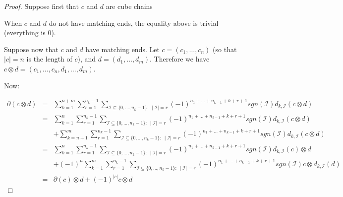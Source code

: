 \documentclass[10pt,a4paper]{amsart}
\begin{document}
\begin{proof}
Suppose first that $c$ and $d$ are cube chains

When $c$ and $d$ do not have matching ends, the equality above is trivial (everything is 0).

Suppose now that $c$ and $d$ have matching ends. 
Let $c=(c_1,\ldots,c_n)$ (so that $|c|=n$ is the length of $c$), and $d=(d_1,\ldots,d_m)$. Therefore we have $c\otimes d=(c_1,\ldots,c_n,d_1,\ldots,d_m)$.

Now: 

$$
\begin{array}{rcl}
{\scriptstyle \partial (c\otimes d)} & {\scriptstyle =} &\sum\limits_{k=1}^{n+m} \sum\limits_{r=1}^{n_k-1} \sum\limits_{\scriptscriptstyle \mathcal{I} \subseteq\{0,\ldots,n_k-1\}: \ \mid \mathcal{I} \mid=r}
{\scriptstyle (-1)^{\scriptscriptstyle n_1+\ldots+n_{k-1}+k+r+1} sgn(\mbox{$\scriptstyle \mathcal{I}$}) d_{k,\mbox{$\scriptscriptstyle \mathcal{I}$}}(c\otimes d)} \\
& {\scriptstyle =} & \sum\limits_{k=1}^{n} \sum\limits_{r=1}^{n_k-1} \sum\limits_{\scriptscriptstyle \mathcal{I} \subseteq\{0,\ldots,n_k-1\}: \ \mid \mathcal{I} \mid=r}
{\scriptstyle (-1)^{\scriptscriptstyle n_1+\ldots+n_{k-1}+k+r+1} sgn(\mbox{$\scriptstyle \mathcal{I}$}) d_{k,\mbox{$\scriptscriptstyle \mathcal{I}$}}(c\otimes d)} \\
& & +\sum\limits_{k=n+1}^{m} \sum\limits_{r=1}^{n_k-1} \sum\limits_{\scriptscriptstyle \mathcal{I} \subseteq\{0,\ldots,n_k-1\}: \ \mid \mathcal{I} \mid=r} 
{\scriptstyle (-1)^{\scriptscriptstyle n_1+\ldots+n_{k-1}+k+r+1}
sgn(\mbox{$\scriptstyle \mathcal{I}$}) d_{k,\mbox{$\scriptscriptstyle \mathcal{I}$}}
 (c\otimes d)} \\ 
& {\scriptstyle =} & \sum\limits_{k=1}^{n} \sum\limits_{r=1}^{n_k-1} \sum\limits_{\scriptscriptstyle \mathcal{I} \subseteq\{0,\ldots,n_k-1\}: \ \mid \mathcal{I} \mid=r}
{\scriptstyle (-1)^{\scriptscriptstyle n_1+\ldots+n_{k-1}+k+r+1} sgn(\mbox{$\scriptstyle \mathcal{I}$}) d_{k,\mbox{$\scriptscriptstyle \mathcal{I}$}}(c)\otimes d} \\
& & +(-1)^n \sum\limits_{k=1}^{m} \sum\limits_{r=1}^{n_k-1} \sum\limits_{\scriptscriptstyle \mathcal{I} \subseteq\{0,\ldots,n_k-1\}: \ \mid \mathcal{I} \mid=r}
{\scriptstyle (-1)^{\scriptscriptstyle n_1+\ldots+n_{k-1}+k+r+1} sgn(\mbox{$\scriptstyle \mathcal{I}$}) c\otimes d_{k,\mbox{$\scriptscriptstyle \mathcal{I}$}}(d)} \\
& {\scriptstyle =} & {\scriptstyle \partial(c)\otimes d +(-1)^{|c|}c\otimes d}
\end{array}
$$
%
\end{proof}
\end{document}
